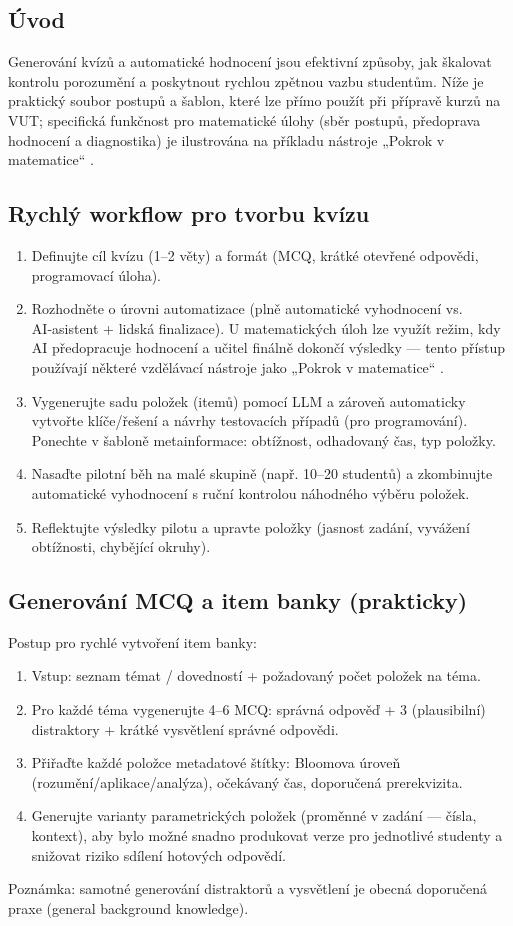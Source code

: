 \subsection*{Úvod}
Generování kvízů a automatické hodnocení jsou efektivní způsoby, jak škalovat kontrolu porozumění a poskytnout rychlou zpětnou vazbu studentům. Níže je praktický soubor postupů a šablon, které lze přímo použít při přípravě kurzů na VUT; specifická funkčnost pro matematické úlohy (sběr postupů, předoprava hodnocení a diagnostika) je ilustrována na příkladu nástroje „Pokrok v matematice“ \cite{kb_ai_101_tipu_pdf_04e4a115_page_8_1}.

\subsection*{Rychlý workflow pro tvorbu kvízu}
\begin{enumerate}
  \item Definujte cíl kvízu (1–2 věty) a formát (MCQ, krátké otevřené odpovědi, programovací úloha).
  \item Rozhodněte o úrovni automatizace (plně automatické vyhodnocení vs. AI‑asistent + lidská finalizace). U matematických úloh lze využít režim, kdy AI předopracuje hodnocení a učitel finálně dokončí výsledky — tento přístup používají některé vzdělávací nástroje jako „Pokrok v matematice“ \cite{kb_ai_101_tipu_pdf_04e4a115_page_8_1}.
  \item Vygenerujte sadu položek (itemů) pomocí LLM a zároveň automaticky vytvořte klíče/řešení a návrhy testovacích případů (pro programování). Ponechte v šabloně metainformace: obtížnost, odhadovaný čas, typ položky.
  \item Nasaďte pilotní běh na malé skupině (např. 10–20 studentů) a zkombinujte automatické vyhodnocení s ruční kontrolou náhodného výběru položek.
  \item Reflektujte výsledky pilotu a upravte položky (jasnost zadání, vyvážení obtížnosti, chybějící okruhy).
\end{enumerate}

\subsection*{Generování MCQ a item banky (prakticky)}
Postup pro rychlé vytvoření item banky:
\begin{enumerate}
  \item Vstup: seznam témat / dovedností + požadovaný počet položek na téma.
  \item Pro každé téma vygenerujte 4–6 MCQ: správná odpověď + 3 (plausibilní) distraktory + krátké vysvětlení správné odpovědi.
  \item Přiřaďte každé položce metadatové štítky: Bloomova úroveň (rozumění/aplikace/analýza), očekávaný čas, doporučená prerekvizita.
  \item Generujte varianty parametrických položek (proměnné v zadání — čísla, kontext), aby bylo možné snadno produkovat verze pro jednotlivé studenty a snižovat riziko sdílení hotových odpovědí.
\end{enumerate}
Poznámka: samotné generování distraktorů a vysvětlení je obecná doporučená praxe (general background knowledge).

